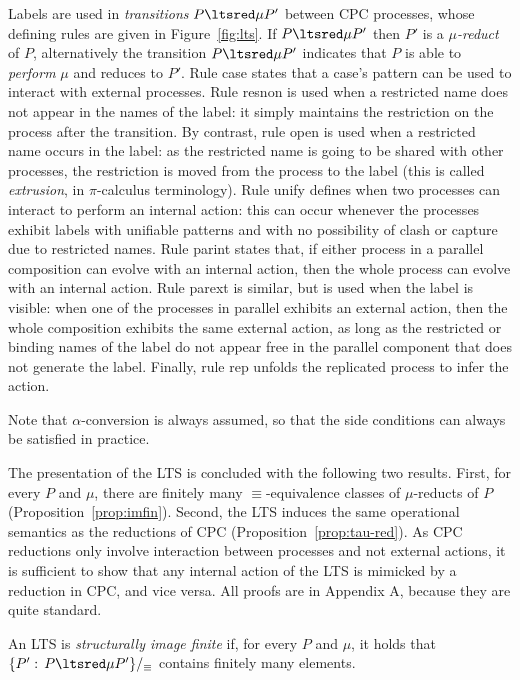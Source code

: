 \documentclass{LMCS}
\begin{document}
Labels are used in {\em transitions} $P\ltsred\mu P'$ between CPC
processes, whose defining rules are given in Figure~\ref{fig:lts}. If
$P\ltsred\mu P'$ then $P'$ is a {\em $\mu$-reduct} of $P$, alternatively the transition $P\ltsred\mu P'$
indicates that $P$ is able to {\em perform} $\mu$ and reduces to $P'$.
Rule {\sf case} states that a case's pattern can be used to interact with external processes.
Rule {\sf resnon} is used when a restricted name does not appear in the names of the label: it simply maintains the restriction on the process after the transition.
By contrast, rule {\sf open} is used when a restricted name occurs in the label: as the restricted name is going to be shared with other processes, the restriction is moved from the process to the label (this is called {\em extrusion}, in $\pi$-calculus terminology).
Rule {\sf unify} defines when two processes can interact to perform an internal action:
this can occur whenever the processes exhibit labels with unifiable patterns and with no possibility of clash or capture due to restricted names.
Rule {\sf parint} states that, if either process in a parallel composition can evolve with an internal action, then the whole process can evolve with an internal action.
Rule {\sf parext} is similar, but is used when the label is visible: when one of the processes in parallel exhibits an external action, then the whole composition exhibits the same external action, as long as the restricted or binding names of the label do not appear free in the parallel component that does not generate the label.
Finally, rule {\sf rep} unfolds the replicated process to infer the action. 

Note that $\alpha$-conversion is always assumed, so that the  side conditions can always be satisfied in practice. 

The presentation of the LTS is concluded with the following two
results.  First, for every $P$ and $\mu$, there are finitely many
$\equiv$-equivalence classes of $\mu$-reducts of $P$
(Proposition~\ref{prop:imfin}).  Second, the LTS induces the same
operational semantics as the reductions of CPC
(Proposition~\ref{prop:tau-red}).  As CPC reductions only involve
interaction between processes and not external actions, it is
sufficient to show that any internal action of the LTS is mimicked by
a reduction in CPC, and vice versa. All proofs are in Appendix A, because they are quite standard.

\begin{defi}
An LTS is {\em structurally image finite} if, for every $P$ and $\mu$, it holds that
$\{P' :\, P \ltsred\mu P'\}/_\equiv$ contains finitely many elements.
\end{defi}
\end{document}
